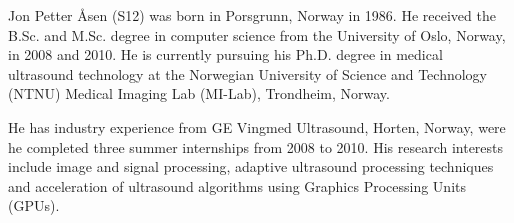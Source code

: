 \documentclass[journal]{IEEEtran}
\begin{document}
\begin{IEEEbiography}{Jon Petter \AA{}sen}
(S12) was born in Porsgrunn, Norway in 1986. He received the B.Sc. and M.Sc. degree in computer science from the University of Oslo, Norway, in 2008 and 2010. He is currently pursuing his Ph.D. degree in medical ultrasound technology at the Norwegian University of Science and Technology (NTNU) Medical Imaging Lab (MI-Lab), Trondheim, Norway. 

He has industry experience from GE Vingmed Ultrasound, Horten, Norway, were he completed three summer internships from 2008 to 2010. His research interests include image and signal processing, adaptive ultrasound processing techniques and acceleration of ultrasound algorithms using Graphics Processing Units (GPUs). 
\end{IEEEbiography}



\end{document}
